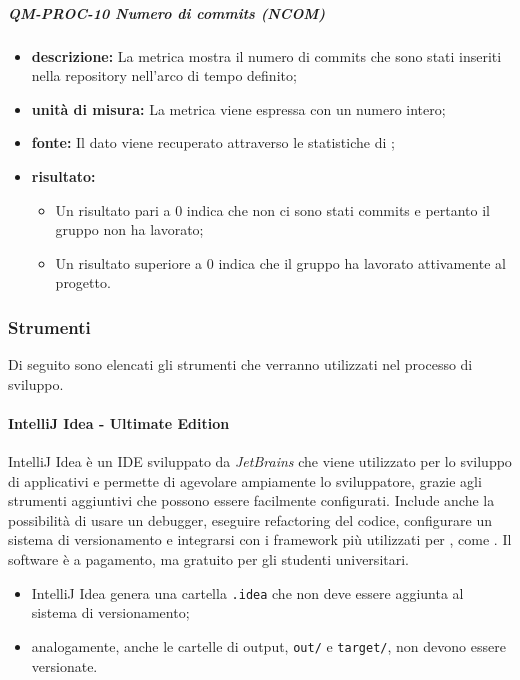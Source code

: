 			\subparagraph{QM-PROC-10 Numero di commits (NCOM)}

			\begin{itemize}
      			\item \textbf{descrizione: }
				La metrica mostra il numero di commits che sono stati inseriti nella repository nell'arco di tempo definito;

				\item \textbf{unità di misura: }
				La metrica viene espressa con un numero intero;

				\item \textbf{fonte: }
				Il dato viene recuperato attraverso le statistiche di ;

				\item \textbf{risultato: }
				\begin{itemize}
					\item Un risultato pari a 0 indica che non ci sono stati commits e pertanto il gruppo non ha lavorato;
					\item Un risultato superiore a 0 indica che il gruppo ha lavorato attivamente al progetto.
				\end{itemize}
			\end{itemize}



		\subsubsection{Strumenti}
			Di seguito sono elencati gli strumenti che verranno utilizzati nel processo di sviluppo.
							
				\paragraph{IntelliJ Idea - Ultimate Edition}
					IntelliJ Idea è un IDE sviluppato da \textit{JetBrains} che viene utilizzato per lo sviluppo di applicativi  e permette di agevolare ampiamente lo sviluppatore, grazie agli strumenti aggiuntivi che possono essere facilmente configurati.
					\newline
					Include anche la possibilità di usare un debugger, eseguire refactoring del codice, configurare un sistema di versionamento e integrarsi con i framework più utilizzati per , come .
					\newline
					Il software è a pagamento, ma gratuito per gli studenti universitari. 

					\begin{itemize}
						\item IntelliJ Idea genera una cartella \verb!.idea! che non deve essere aggiunta al sistema di versionamento;
						\item analogamente, anche le cartelle di output, \verb!out/! e \verb!target/!, non devono essere versionate.
					\end{itemize}

